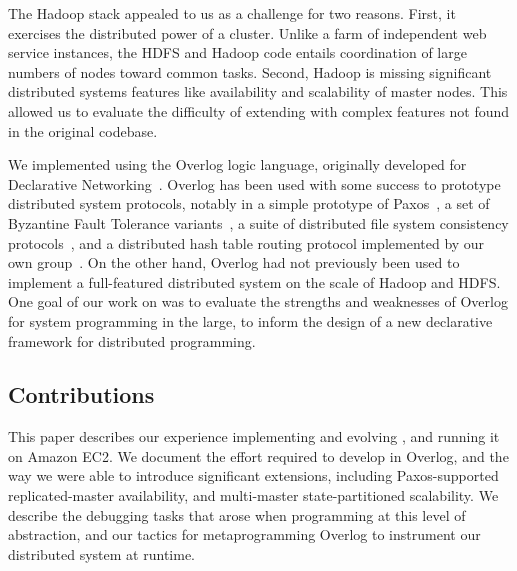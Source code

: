 The Hadoop stack appealed to us as a challenge for two reasons.  First, it
exercises the distributed power of a cluster.  Unlike a farm of independent web
service instances, the HDFS and Hadoop code entails coordination of large
numbers of nodes toward common tasks.  Second, Hadoop is missing significant
distributed systems features like availability and scalability of master
nodes. This allowed us to evaluate the difficulty of extending \BOOMA with
complex features not found in the original codebase.


We implemented \BOOMA using the Overlog logic language, originally developed for
Declarative Networking~\cite{p2:sosp}.  Overlog has been used with some success to
prototype distributed system protocols, notably in a simple prototype of
Paxos~\cite{paxonp2}, a set of Byzantine Fault Tolerance variants~\cite{singh-nsdi}, a suite of distributed file system consistency
protocols~\cite{pads}, and a distributed hash table routing protocol implemented
by our own group~\cite{p2:sosp}.  On the other hand, Overlog had not previously been
used to implement a full-featured distributed system on the scale of Hadoop and
HDFS\@.  One goal of our work on \BOOMA was to evaluate the strengths and
weaknesses of Overlog for system programming in the large, to inform the design of a new declarative
framework for distributed programming.

\subsection{Contributions}
\label{sec:contributions}
This paper describes our experience implementing and evolving \BOOMA, and
running it on Amazon EC2.  We document the effort required to develop \BOOMA in
Overlog, and the way we were able to introduce significant extensions, including
Paxos-supported replicated-master availability, and multi-master
state-partitioned scalability.  We describe the debugging tasks that arose when
programming at this level of abstraction, and our tactics for metaprogramming
Overlog to instrument our distributed system at runtime.

